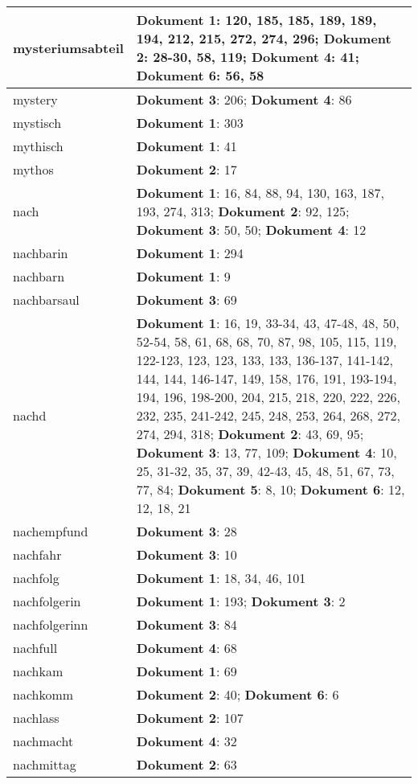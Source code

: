 \documentclass[a5paper]{article}
\begin{document}
\begin{longtable}[l]{|l|p{3in}|}
\hline
mysteriumsabteil & \textbf{Dokument 1}: 120, 185, 185, 189, 189, 194, 212, 215, 272, 274, 296; \textbf{Dokument 2}: 28-30, 58, 119; \textbf{Dokument 4}: 41; \textbf{Dokument 6}: 56, 58 \\
\hline
mystery & \textbf{Dokument 3}: 206; \textbf{Dokument 4}: 86 \\
\hline
mystisch & \textbf{Dokument 1}: 303 \\
\hline
mythisch & \textbf{Dokument 1}: 41 \\
\hline
mythos & \textbf{Dokument 2}: 17 \\
\hline
nach & \textbf{Dokument 1}: 16, 84, 88, 94, 130, 163, 187, 193, 274, 313; \textbf{Dokument 2}: 92, 125; \textbf{Dokument 3}: 50, 50; \textbf{Dokument 4}: 12 \\
\hline
nachbarin & \textbf{Dokument 1}: 294 \\
\hline
nachbarn & \textbf{Dokument 1}: 9 \\
\hline
nachbarsaul & \textbf{Dokument 3}: 69 \\
\hline
nachd & \textbf{Dokument 1}: 16, 19, 33-34, 43, 47-48, 48, 50, 52-54, 58, 61, 68, 68, 70, 87, 98, 105, 115, 119, 122-123, 123, 123, 133, 133, 136-137, 141-142, 144, 144, 146-147, 149, 158, 176, 191, 193-194, 194, 196, 198-200, 204, 215, 218, 220, 222, 226, 232, 235, 241-242, 245, 248, 253, 264, 268, 272, 274, 294, 318; \textbf{Dokument 2}: 43, 69, 95; \textbf{Dokument 3}: 13, 77, 109; \textbf{Dokument 4}: 10, 25, 31-32, 35, 37, 39, 42-43, 45, 48, 51, 67, 73, 77, 84; \textbf{Dokument 5}: 8, 10; \textbf{Dokument 6}: 12, 12, 18, 21 \\
\hline
nachempfund & \textbf{Dokument 3}: 28 \\
\hline
nachfahr & \textbf{Dokument 3}: 10 \\
\hline
nachfolg & \textbf{Dokument 1}: 18, 34, 46, 101 \\
\hline
nachfolgerin & \textbf{Dokument 1}: 193; \textbf{Dokument 3}: 2 \\
\hline
nachfolgerinn & \textbf{Dokument 3}: 84 \\
\hline
nachfull & \textbf{Dokument 4}: 68 \\
\hline
nachkam & \textbf{Dokument 1}: 69 \\
\hline
nachkomm & \textbf{Dokument 2}: 40; \textbf{Dokument 6}: 6 \\
\hline
nachlass & \textbf{Dokument 2}: 107 \\
\hline
nachmacht & \textbf{Dokument 4}: 32 \\
\hline
nachmittag & \textbf{Dokument 2}: 63 \\

\end{longtable}
\end{document}

